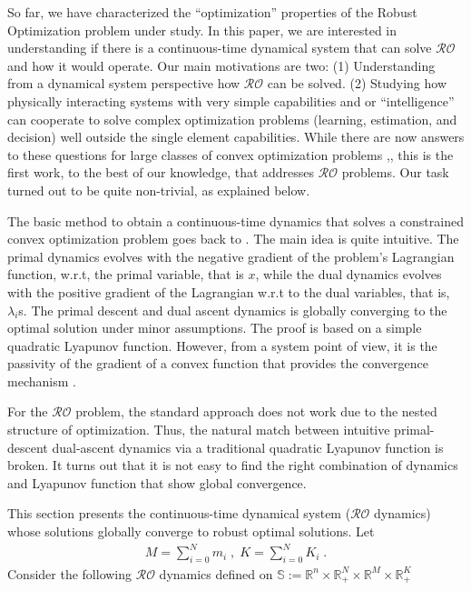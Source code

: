\documentclass[journal,twoside,web]{ieeecolor}
\begin{document}
So far, we have characterized the ``optimization'' properties of the Robust Optimization problem under study. In this paper, we are interested in understanding if there is a continuous-time dynamical system that can solve $\mathcal{RO}$ and how it would operate. Our main motivations are two: (1) Understanding from a dynamical system perspective how $\mathcal{RO}$ can be solved. (2) Studying how physically interacting systems with very simple capabilities and or ``intelligence'' can cooperate to solve complex optimization problems (learning, estimation, and decision) well outside the single element capabilities. While there are now answers to these questions for large classes of convex optimization problems \cite{feijer2010},\cite{wang2011}, this is the first work, to the best of our knowledge, that addresses $\mathcal{RO}$ problems. Our task turned out to be quite non-trivial, as explained below.

The basic method to obtain a continuous-time dynamics that solves a constrained convex optimization problem goes back to \cite{arrow1958}. The main idea is quite intuitive. The primal dynamics evolves with the negative gradient of the problem's Lagrangian function, w.r.t, the primal variable, that is $x$, while the dual dynamics evolves with the positive gradient of the Lagrangian w.r.t to the dual variables, that is, $\lambda_i$s. The primal descent and dual ascent dynamics is globally converging to the optimal solution under minor assumptions. The proof is based on a simple quadratic Lyapunov function. However, from a system point of view, it is the passivity of the gradient of a convex function that provides the convergence mechanism \cite{simpson2016,kosaraju2018}.

For the $\mathcal{RO}$ problem, the standard approach does not work due to the nested structure of optimization. Thus, the natural match between intuitive primal-descent dual-ascent dynamics via a traditional quadratic Lyapunov function is broken. It turns out that it is not easy to find the right combination of dynamics and Lyapunov function that show global convergence.

This section presents the continuous-time dynamical system ($\mathcal{RO}$ dynamics) whose solutions globally converge to robust optimal solutions. Let
\begin{align*}
M=\sum_{i=0}^{N}m_i\;,\; K=\sum_{i=0}^{N}K_i\;.
\end{align*}
Consider the following $\mathcal{RO}$ dynamics defined on $\mathbb{S}:= \mathbb{R}^n \times \mathbb{R}^N_{+} \times \mathbb{R}^M \times \mathbb{R}^K_+$\;
\end{document}
